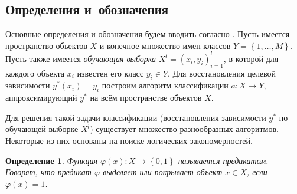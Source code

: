 \documentclass[12pt]{article}
\newtheorem{definition}{Определение}
\begin{document}


\subsection{Определения и~обозначения}
\label{subsec:defs}



Основные определения и обозначения будем вводить согласно
\cite{voron10logicalgs}. Пусть имеется пространство объектов \(X\) и
конечное множество имен классов \(Y = \left\{1, \dots,
M\right\}\). Пусть также имеется \emph{обучающая выборка} \(X^{l} =
(x_i, y_i)_{i = 1}^{l}\), в которой для каждого объекта \(x_i\)
известен его класс \(y_i \in Y\).  Для восстановления целевой
зависимости \(y^{*}(x_i) = y_i\) построим алгоритм классификации
\(a\colon X \rightarrow Y\), аппроксимирующий \(y^{*}\) на всём
пространстве объектов \(X\).

Для решения такой задачи классификации (восстановления зависимости
\(y^{*}\) по обучающей выборке \(X^l\)) существует множество
разнообразных алгоритмов. Некоторые из них основаны на поиске
логических закономерностей.

\begin{definition}
  Функция \(\varphi(x) \colon X \rightarrow \left\{0, 1\right\}\)
  называется \emph{предикатом}. Говорят, что предикат
  \(\varphi\) \emph{выделяет} или \emph{покрывает} объект \(x \in X\),
  если \(\varphi(x) = 1\).
\end{definition}
\end{document}
